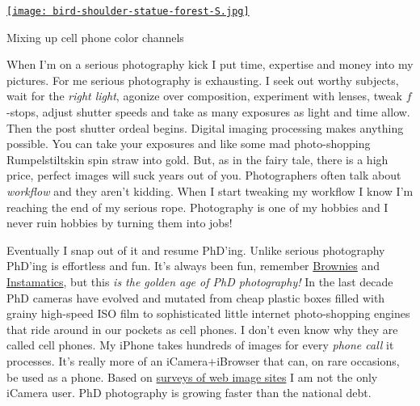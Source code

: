 \begin{floatingfigure}[r]{0.23\textwidth}
\centering
\href{http://conceptcontrol.smugmug.com/Themes/Diaries/Cell-Phoning-It-In/17756793\_PfCsJz}{\texttt{[image: bird-shoulder-statue-forest-S.jpg]}}
\caption{Mixing up cell phone color channels}
\label{fig:2215X2}
\end{floatingfigure}When I'm on a serious photography kick I put time, expertise and money
into my pictures. For me serious photography is exhausting. I seek out
worthy subjects, wait for the \emph{right light}, agonize over
composition, experiment with lenses, tweak $f$-stops, adjust shutter
speeds and take as many exposures as light and time allow. Then the post
shutter ordeal begins. Digital imaging processing makes anything
possible. You can take your exposures and like some mad photo-shopping
Rumpelstiltskin spin straw into gold. But, as in the fairy tale, there
is a high price, perfect images will suck years out of you.
Photographers often talk about \emph{workflow} and they aren't kidding.
When I start tweaking my workflow I know I'm reaching the end of my
serious rope. Photography is one of my hobbies and I never ruin hobbies
by turning them into jobs!


Eventually I snap out of it and resume PhD'ing. Unlike serious
photography PhD'ing is effortless and fun. It's always been fun,
remember \href{http://www.brownie-camera.com/}{Brownies} and
\href{http://camerapedia.wikia.com/wiki/Instamatic}{Instamatics}, but
this \emph{is the golden age of PhD photography!} In the last decade PhD
cameras have evolved and mutated from cheap plastic boxes filled with
grainy high-speed ISO film to sophisticated little internet
photo-shopping engines that ride around in our pockets as cell phones. I
don't even know why they are called cell phones. My iPhone takes
hundreds of images for every \emph{phone call} it processes. It's really
more of an iCamera+iBrowser that can, on rare occasions, be used as a
phone. Based on
\href{http://1000memories.com/blog/94-number-of-photos-ever-taken-digital-and-analog-in-shoebox}{surveys
of web image sites} I am not the only iCamera user. PhD photography is
growing faster than the national debt.


